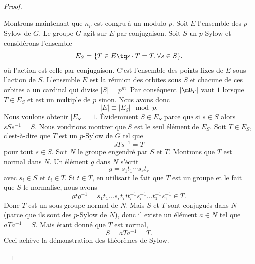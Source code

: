\begin{proof}
\begin{enumerate}
		      Montrons maintenant que \( n_p\) est congru à un modulo \( p\). Soit \( E\) l'ensemble des \( p\)-Sylow de \( G\). Le groupe \( G\) agit sur \( E\) par conjugaison. Soit \( S\) un \( p\)-Sylow et considérons l'ensemble
		      \begin{equation}
			      E_S=\{ T\in E\tq s\cdot T=T, \forall s\in S \}.
		      \end{equation}
		      où l'action est celle par conjugaison. C'est l'ensemble des points fixes de \( E\) sous l'action de \( S\). L'ensemble \( E\) est la réunion des orbites sous \( S\) et chacune de ces orbites a un cardinal qui divise \( | S |=p^m\). Par conséquent \( | \mO_T |\) vaut \( 1\) lorsque \( T\in E_S\) et est un multiple de \( p\) sinon. Nous avons donc
		      \begin{equation}
			      | E |\equiv | E_S |\mod p.
		      \end{equation}
		      Nous voulons obtenir \( | E_S |=1\). Évidemment \( S\in E_S\) parce que si \( s\in S\) alors \( sSs^{-1}=S\). Nous voudrions montrer que \( S\) est le seul élément de \( E_S\). Soit \( T\in E_S\), c'est-à-dire que \( T\) est un \( p\)-Sylow de \( G\) tel que
		      \begin{equation}
			      sTs^{-1}=T
		      \end{equation}
		      pour tout \( s\in S\). Soit \( N\) le groupe engendré par \( S\) et \( T\). Montrons que \( T\) est normal dans \( N\). Un élément \( g\) dans \( N\) s'écrit
		      \begin{equation}
			      g=s_1t_1\cdots s_rt_r
		      \end{equation}
		      avec \( s_i\in S\) et \( t_i\in T\). Si \( t\in T\), en utilisant le fait que \( T\) est un groupe et le fait que \( S\) le normalise, nous avons
		      \begin{equation}
			      gtg^{-1}=s_1t_1\ldots s_rt_rtt_r^{-1}s_r^{-1}\ldots t_1^{-1}s_1^{-1}\in T.
		      \end{equation}
		      Donc \( T\) est un sous-groupe normal de \( N\). Mais \( S\) et \( T\) sont conjugués dans \( N\) (parce que ils sont des \( p\)-Sylow de \( N\)), donc il existe un élément \( a\in N\) tel que \( aTa^{-1}=S\). Mais étant donné que \( T\) est normal,
		      \begin{equation}
			      S=aTa^{-1}=T.
		      \end{equation}
		      Ceci achève la démonstration des théorèmes de Sylow.

	\end{enumerate}
\end{proof}


